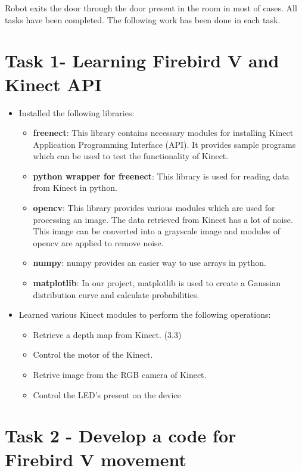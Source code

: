 \documentclass{report}
\begin{document}
Robot exits the door through the door present in the room in most of cases. All tasks have been completed.
The following work has been done in each task.

\section{Task 1- Learning Firebird V and Kinect API}
\begin{itemize}
\item Installed the following libraries:
\begin{itemize}
 \item \textbf{freenect}: This library contains necessary modules for installing Kinect Application Programming Interface (API). It provides sample 
			  programs which can be used to test the functionality of Kinect.
 \item \textbf{python wrapper for freenect}: This library is used for reading data from Kinect in python.
 \item \textbf{opencv}: This library provides various modules which are used for processing an image. The data retrieved from
			Kinect has a lot of noise. This image can be converted into a grayscale image and modules of opencv are applied to remove noise.
 \item \textbf{numpy}: numpy provides an easier way to use arrays in python.
 \item \textbf{matplotlib}: In our project, matplotlib is used to create a Gaussian distribution curve and calculate probabilities.
\end{itemize}

\item Learned various Kinect modules to perform the following operations:
\begin{itemize}
 \item Retrieve a depth map from Kinect. (3.3)
 \item Control the motor of the Kinect.
 \item Retrive image from the RGB camera of Kinect.
 \item Control the LED's present on the device
\end{itemize}

\end{itemize}

\section{Task 2 - Develop a code for Firebird V movement}
\end{document}

